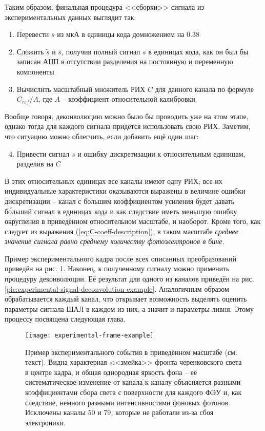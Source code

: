 Таким образом, финальная процедура <<сборки>> сигнала из экспериментальных данных выглядит так:

\begin{enumerate}
	\item Перевести $\bar{s}$ из мкА в единицы кода домножением на $0.38$
	\item Сложить $\tilde{s}$ и $\bar{s}$, получив полный сигнал $s$ в единицах кода, как он был бы записан АЦП в отсутствии разделения на постоянную и переменную компоненты
	\item Вычислить масштабный множитель РИХ $C$ для данного канала по формуле $C_{ref} / A$, где $A$ -- коэффициент относительной калибровки
\end{enumerate}

Вообще говоря, деконволюцию можно было бы проводить уже на этом этапе, однако тогда для каждого сигнала придётся использовать свою РИХ. Заметим, что ситуацию можно облегчить, если добавить ещё один шаг:

\begin{enumerate}
	\setcounter{enumi}{3}
	\item Привести сигнал $s$ и ошибку дискретизации к относительным единицам, разделив на $C$
\end{enumerate}

В этих относительных единицах все каналы имеют одну РИХ; все их индивидуальные характеристики оказываются выражены в величине ошибки дискретизации -- канал с большим коэффициентом усиления будет давать б\'{о}льший сигнал в единицах кода и как следствие иметь меньшую ошибку округления в приведённом относительном масштабе, и наоборот. Кроме того, как следует из выражения (\ref{eq:C-coeff-description}), в таком масштабе \textit{среднее значение сигнала равно среднему количеству фотоэлектронов в бине}.

Пример экспериментального кадра после всех описанных преобразований приведён на рис. \ref{pic:experimental-frame-example}. Наконец, к полученному сигналу можно применить процедуру деконволюции. Её результат для одного из каналов приведён на рис. \ref{pic:experimental-signal-deconvolution-example}. Аналогичным образом обрабатывается каждый канал, что открывает возможность выделять оценить параметры сигнала ШАЛ в каждом из них, а значит и параметры ливня. Этому процессу посвящена следующая глава.

\begin{figure}
	\centering
	\texttt{[image: experimental-frame-example]}
	\caption{Пример экспериментального события в приведённом масштабе (см. текст). Видна характерная <<змейка>> фронта черенковского света в центре кадра, и общая однородная яркость фона -- её систематическое изменение от канала к каналу объясняется разными коэффициентами сбора света с поверхности для каждого ФЭУ и, как следствие, немного разными интенсивностями фоновых фотонов. Исключены каналы $50$ и $79$, которые не работали из-за сбоя электроники.}
	\label{pic:experimental-frame-example}
\end{figure}


